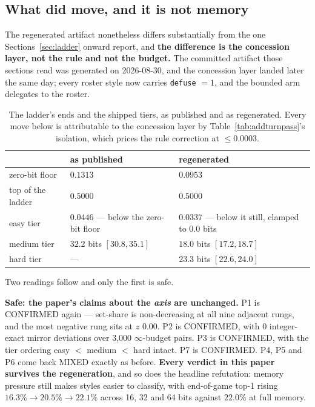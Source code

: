 \documentclass[11pt]{article}
\newcommand{\code}[1]{\texttt{#1}}
\begin{document}
\subsection{What did move, and it is not memory}
\label{sec:addconcession}

The regenerated artifact nonetheless differs substantially from the one Sections~\ref{sec:ladder}
onward report, and \textbf{the difference is the concession layer, not the rule and not the
budget.} The committed artifact those sections read was generated on 2026-08-30, and the
concession layer \cite{concession} landed later the same day; every roster style now carries
\code{defuse} $=1$, and the bounded arm delegates to the roster.

\begin{table}[t]
\centering
\caption{The ladder's ends and the shipped tiers, as published and as regenerated. Every move
below is attributable to the concession layer by Table~\ref{tab:addturnpass}'s isolation, which
prices the rule correction at $\le 0.0003$.}
\label{tab:addtiers}
\footnotesize
\begin{tabular}{@{}lll@{}}
\toprule
 & as published & regenerated \\
\midrule
zero-bit floor & $0.1313$ & $0.0953$ \\
top of the ladder & $0.5000$ & $0.5000$ \\
easy tier & $0.0446$ --- below the zero-bit floor & $0.0337$ --- below it still, clamped to $0.0$ bits \\
medium tier & $32.2$ bits $[30.8, 35.1]$ & $\mathbf{18.0}$ bits $[17.2, 18.7]$ \\
hard tier & --- & $23.3$ bits $[22.6, 24.0]$ \\
\bottomrule
\end{tabular}
\end{table}

Two readings follow and only the first is safe.

\textbf{Safe: the paper's claims about the \emph{axis} are unchanged.} P1 is CONFIRMED again ---
set-share is non-decreasing at all nine adjacent rungs, and the most negative rung sits at $z$
$0.00$. P2 is CONFIRMED, with 0 integer-exact mirror deviations over 3{,}000 $\infty$-budget
pairs. P3 is CONFIRMED, with the tier ordering easy $<$ medium $<$ hard intact. P7 is CONFIRMED.
P4, P5 and P6 come back MIXED exactly as before. \textbf{Every verdict in this paper survives the
regeneration}, and so does the headline refutation: memory pressure still makes styles easier to
classify, with end-of-game top-1 rising $16.3\% \to 20.5\% \to 22.1\%$ across 16, 32 and 64 bits
against $22.0\%$ at full memory.
\end{document}
